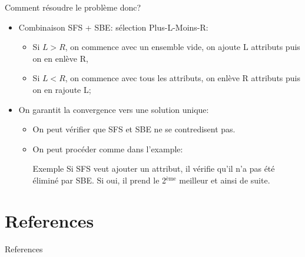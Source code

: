 \documentclass[9pt]{beamer}
\begin{document}
	\begin{frame}{Comment résoudre le problème donc?}
		\begin{itemize}
			\item<1-> Combinaison SFS + SBE: sélection Plus-L-Moins-R:
			\begin{itemize}
				\item Si $L > R$, on commence avec un ensemble vide, on ajoute L attributs puis on en enlève R,
				\item Si $L < R$, on commence avec tous les attributs, on enlève R attributs puis on en rajoute L;
			\end{itemize}
			\item<2-> On garantit la convergence vers une solution unique:
			\begin{itemize}
				\item On peut vérifier que SFS et SBE ne se contredisent pas.
				\item On peut procéder comme dans l'example:
				\begin{block}{Exemple}
					Si SFS veut ajouter un attribut, il vérifie qu'il n'a pas été éliminé par SBE. Si oui, il prend le 2$^{\text{ème}}$ meilleur et ainsi de suite.
				\end{block}
			\end{itemize}
		\end{itemize}
	\end{frame}

	\section*{References}
	\begin{frame}[allowframebreaks]{References}
		\nocite{sklearn_api}
		
		
	\end{frame}
\end{document}
